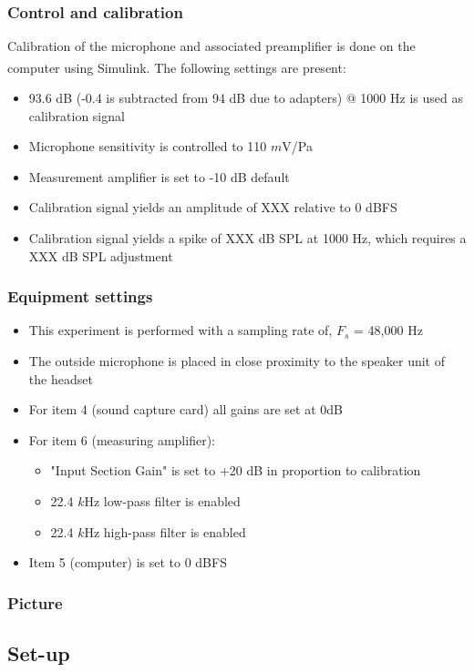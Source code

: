 \subsubsection{Control and calibration}
Calibration of the microphone and associated preamplifier is done on the computer using Simulink\textsuperscript{\textregistered}. The following settings are present:
\begin{itemize}
	\item 93.6 dB (-0.4 is subtracted from 94 dB due to adapters) $@$ 1000 Hz is used as calibration signal
	\item Microphone sensitivity is controlled to 110 $m$V/Pa
	\item Measurement amplifier is set to -10 dB default
	\item Calibration signal yields an amplitude of XXX relative to 0 dBFS
	\item  Calibration signal yields a spike of XXX dB SPL at 1000 Hz, which requires a XXX dB SPL adjustment
\end{itemize}
\subsubsection{Equipment settings}
\begin{itemize}
	\item This experiment is performed with a sampling rate of, $F_{s}$ = 48,000 Hz
	\item The outside microphone is placed in close proximity to the speaker unit of the headset
	\item For item 4 (sound capture card) all gains are set at 0dB		
	\item For item 6 (measuring amplifier):
	\begin{itemize}
		\item "Input Section Gain" is set to +20 dB in proportion to calibration
		\item 22.4 $k$Hz low-pass filter is enabled
		\item 22.4 $k$Hz high-pass filter is enabled 
	\end{itemize}
	\item Item 5 (computer) is set to 0 dBFS
\end{itemize}

\subsubsection{Picture}

\subsection{Set-up}

